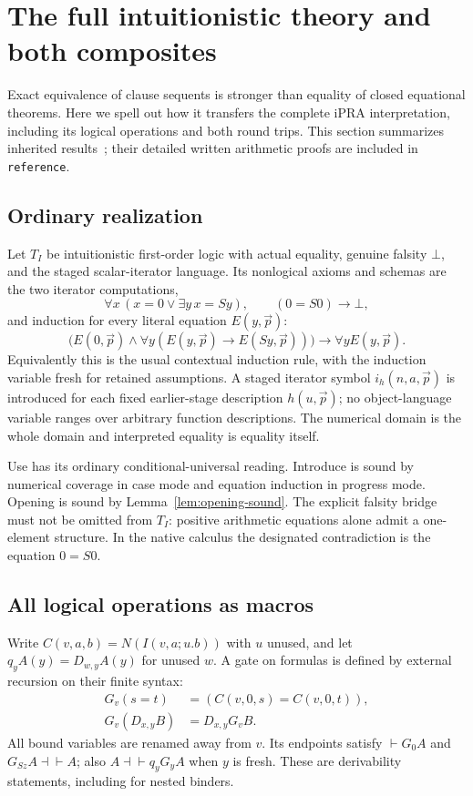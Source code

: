 \section{The full intuitionistic theory and both composites}
\label{sec:bridge}

Exact equivalence of clause sequents is stronger than equality of closed
equational theorems. Here we spell out how it transfers the complete
iPRA interpretation, including its logical operations and both round
trips. This section summarizes inherited results~\cite{repo,lean,arithmetic};
their detailed written arithmetic proofs are included in \texttt{reference}.

\subsection{Ordinary realization}
Let $T_I$ be intuitionistic first-order logic with actual equality,
genuine falsity $\bot$, and the staged scalar-iterator language. Its
nonlogical axioms and schemas are the two iterator computations,
\[
 \forall x\,(x=0\vee\exists y\,x=Sy),
 \qquad (0=S0)\to\bot,
\]
and induction for every literal equation $E(y,\vec p)$:
\[
 \bigl(E(0,\vec p)\wedge
       \forall y(E(y,\vec p)\to E(Sy,\vec p))\bigr)
       \to\forall y E(y,\vec p).
\]
Equivalently this is the usual contextual induction rule, with the
induction variable fresh for retained assumptions. A staged iterator
symbol $i_h(n,a,\vec p)$ is introduced for each fixed earlier-stage
description $h(u,\vec p)$; no object-language variable ranges over
arbitrary function descriptions. The numerical domain is the whole
domain and interpreted equality is equality itself.

Use has its ordinary conditional-universal reading. Introduce is sound
by numerical coverage in case mode and equation induction in progress
mode. Opening is sound by Lemma~\ref{lem:opening-sound}. The explicit
falsity bridge must not be omitted from $T_I$: positive arithmetic
equations alone admit a one-element structure. In the native calculus
the designated contradiction is the equation $0=S0$.

\subsection{All logical operations as macros}
Write $C(v,a,b)=N(I(v,a;u.b))$ with $u$ unused, and let
$q_y A(y)=D_{w,y}A(y)$ for unused $w$. A gate on formulas is defined by
external recursion on their finite syntax:
\[
 \begin{aligned}
 G_v(s=t)&=(C(v,0,s)=C(v,0,t)),\\
 G_v(D_{x,y}B)&=D_{x,y}G_vB.
 \end{aligned}
\]
All bound variables are renamed away from $v$. Its endpoints satisfy
$\vdash G_0A$ and $G_{Sz}A\dashv\vdash A$; also
$A\dashv\vdash q_yG_yA$ when $y$ is fresh. These are derivability
statements, including for nested binders.

